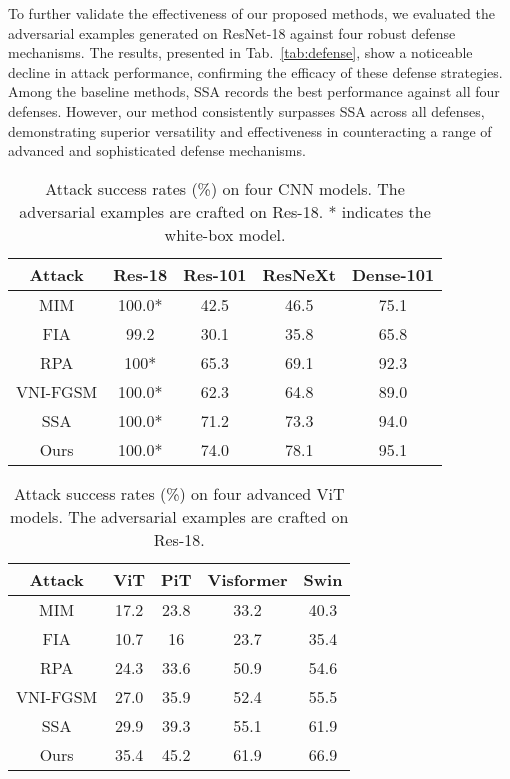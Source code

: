 To further validate the effectiveness of our proposed methods, we evaluated the adversarial examples generated on ResNet-18 against four robust defense mechanisms. The results, presented in Tab.~\ref{tab:defense}, show a noticeable decline in attack performance, confirming the efficacy of these defense strategies. Among the baseline methods, SSA records the best performance against all four defenses. However, our method consistently surpasses SSA across all defenses, demonstrating superior versatility and effectiveness in counteracting a range of advanced and sophisticated defense mechanisms.

\begin{table}[tb]
    \centering
    \begin{tabular}{cc*{3}{c}}
        \toprule
        Attack & Res-18 & Res-101 & ResNeXt & Dense-101 \\
        \midrule
        MIM &  100.0* & 42.5 & 46.5 & 75.1 \\
        FIA &  99.2 & 30.1 & 35.8 & 65.8 \\
        RPA &  100* & 65.3 & 69.1 & 92.3 \\
        VNI-FGSM &  100.0* & 62.3 & 64.8 & 89.0 \\
        SSA & 100.0* & 71.2 & 73.3 & 94.0 \\
        Ours & 100.0* & 74.0 & 78.1 & 95.1 \\
        \bottomrule
    \end{tabular}
    \caption{Attack success rates (\%) on four CNN models. The adversarial examples are crafted on Res-18. * indicates the white-box model.}
    \label{tab:attack_cnn}
\end{table}

\begin{table}[tb]
    \centering
    \begin{tabular}{cc*{3}{c}}
        \toprule
        Attack & ViT & PiT & Visformer & Swin\\
        \midrule
        MIM & 17.2 & 23.8 & 33.2 & 40.3 \\
        FIA & 10.7 & 16 & 23.7 & 35.4 \\
        RPA & 24.3 & 33.6 & 50.9 & 54.6 \\
        VNI-FGSM & 27.0 & 35.9 & 52.4 & 55.5 \\
        SSA & 29.9 & 39.3 & 55.1 & 61.9 \\
        Ours & 35.4 & 45.2 & 61.9 & 66.9\\
        \bottomrule
    \end{tabular}
    \caption{Attack success rates (\%) on four advanced ViT models. The adversarial examples are crafted on Res-18.}
    \label{tab:attack_vit}
\end{table}

